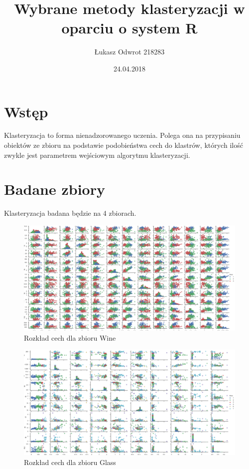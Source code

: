 \documentclass[12pt,a4paper]{article}
\title{Wybrane metody klasteryzacji w oparciu o system R}
\date{24.04.2018}
\author{Łukasz Odwrot 218283}
\begin{document}
\maketitle
\thispagestyle{empty}
\newpage
\tableofcontents
\setcounter{page}{1}
\newpage

\section{Wstęp}
Klasteryzacja to forma nienadzorowanego uczenia. Polega ona na przypisaniu obiektów ze zbioru na podstawie podobieństwa cech do klastrów, których ilość zwykle jest parametrem wejściowym algorytmu klasteryzacji.
\section{Badane zbiory}

Klasteryzacja badana będzie na 4 zbiorach.
\begin{figure}[H]
\centering
\includegraphics[width=1\textwidth]{dsWineCombined.png}
\caption{Rozkład cech dla zbioru Wine}
\end{figure}

\begin{figure}[H]
\centering
\includegraphics[width=1\textwidth]{dsGlassCombined.png}
\caption{Rozkład cech dla zbioru Glass}
\end{figure}
\end{document}
